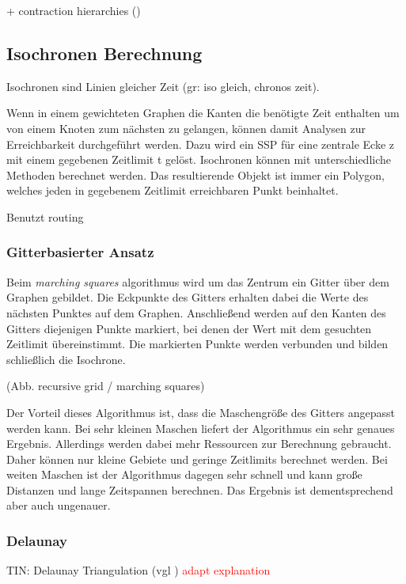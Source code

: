 \documentclass[10pt,a4paper]{article}
\newcommand\todo[1]{\textcolor{red}{#1}}
\begin{document}
+ contraction hierarchies
(\cite[212]{kurt})

\subsection{Isochronen Berechnung}

Isochronen sind Linien gleicher Zeit (gr: iso gleich, chronos zeit).

Wenn in einem gewichteten Graphen die Kanten die benötigte Zeit enthalten um von einem Knoten zum nächsten zu gelangen, können damit Analysen zur Erreichbarkeit durchgeführt werden. Dazu wird ein SSP für eine zentrale Ecke z mit einem gegebenen Zeitlimit t gelöst.
Isochronen können mit unterschiedliche Methoden berechnet werden. Das resultierende Objekt ist immer ein Polygon, welches jeden in gegebenem Zeitlimit erreichbaren Punkt beinhaltet.

Benutzt routing

\subsubsection{Gitterbasierter Ansatz}
Beim \textit{marching squares} algorithmus wird um das Zentrum ein Gitter über dem Graphen gebildet. Die Eckpunkte des Gitters erhalten dabei die Werte des nächsten Punktes auf dem Graphen. Anschließend werden auf den Kanten des Gitters diejenigen Punkte markiert, bei denen der Wert mit dem gesuchten Zeitlimit übereinstimmt. Die markierten Punkte werden verbunden und bilden schließlich die Isochrone.

(Abb. recursive grid / marching squares)

Der Vorteil dieses Algorithmus ist, dass die Maschengröße des Gitters angepasst werden kann. Bei sehr kleinen Maschen liefert der Algorithmus ein sehr genaues Ergebnis. Allerdings werden dabei mehr Ressourcen zur Berechnung gebraucht. Daher können nur kleine Gebiete und geringe Zeitlimits berechnet werden. Bei weiten Maschen ist der Algorithmus dagegen sehr schnell und kann große Distanzen und lange Zeitspannen berechnen. Das Ergebnis ist dementsprechend aber auch ungenauer.

\subsubsection{Delaunay}
TIN: Delaunay Triangulation
(vgl \cite{isochrones})
\todo{adapt explanation}
\end{document}
